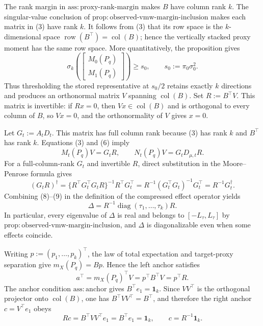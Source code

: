 The rank margin in \(\mathrm{ass:proxy\text{-}rank\text{-}margin}\) makes \(B\) have column rank \(k\).  The singular-value conclusion of \(\mathrm{prop:observed\text{-}vmw\text{-}margin\text{-}inclusion}\) makes each matrix in (3) have rank \(k\).  It follows from (3) that its row space is the \(k\)-dimensional space \(\operatorname{row}(B^\top)=\operatorname{col}(B)\); hence the vertically stacked proxy moment has the same row space.  More quantitatively, the proposition gives
\[
\sigma_k\!\left(\begin{bmatrix}M_0(P_q)\\M_1(P_q)\end{bmatrix}\right)
\ge s_0,\qquad s_0:=\pi_0\sigma_0^2. \tag{7}
\]
Thus thresholding the stored representative at \(s_0/2\) retains exactly \(k\) directions and produces an orthonormal matrix \(V\) spanning \(\operatorname{col}(B)\).  Set \(R:=B^\top V\).  This matrix is invertible: if \(Rx=0\), then \(Vx\in\operatorname{col}(B)\) and is orthogonal to every column of \(B\), so \(Vx=0\), and the orthonormality of \(V\) gives \(x=0\).

Let \(G_t:=A_tD_t\).  This matrix has full column rank because (3) has rank \(k\) and \(B^\top\) has rank \(k\).  Equations (3) and (6) imply
\[
M_t(P_q)V=G_tR,
\qquad
N_t(P_q)V=G_tD_{\mu,t}R. \tag{8}
\]
For a full-column-rank \(G_t\) and invertible \(R\), direct substitution in the Moore--Penrose formula gives
\[
(G_tR)^\dagger
=\{R^\top G_t^\top G_tR\}^{-1}R^\top G_t^\top
=R^{-1}(G_t^\top G_t)^{-1}G_t^\top
=R^{-1}G_t^\dagger. \tag{9}
\]
Combining (8)--(9) in the definition of the compressed effect operator yields
\[
\Delta
=R^{-1}\operatorname{diag}(\tau_1,\ldots,\tau_k)R. \tag{10}
\]
In particular, every eigenvalue of \(\Delta\) is real and belongs to \([-L_{\tau},L_{\tau}]\) by \(\mathrm{prop:observed\text{-}vmw\text{-}margin\text{-}inclusion}\), and \(\Delta\) is diagonalizable even when some effects coincide.

Writing \(p:=(p_1,\ldots,p_k)^\top\), the law of total expectation and target-proxy separation give \(m_X(P_q)=Bp\).  Hence the left anchor satisfies
\[
a^\top=m_X(P_q)^\top V=p^\top B^\top V=p^\top R. \tag{11}
\]
The anchor condition \(\mathrm{ass:anchor}\) gives \(B^\top e_1=\mathbf 1_k\).  Since \(VV^\top\) is the orthogonal projector onto \(\operatorname{col}(B)\), one has \(B^\top VV^\top=B^\top\), and therefore the right anchor \(c=V^\top e_1\) obeys
\[
Rc=B^\top VV^\top e_1=B^\top e_1=\mathbf 1_k,
\qquad c=R^{-1}\mathbf 1_k. \tag{12}
\]

